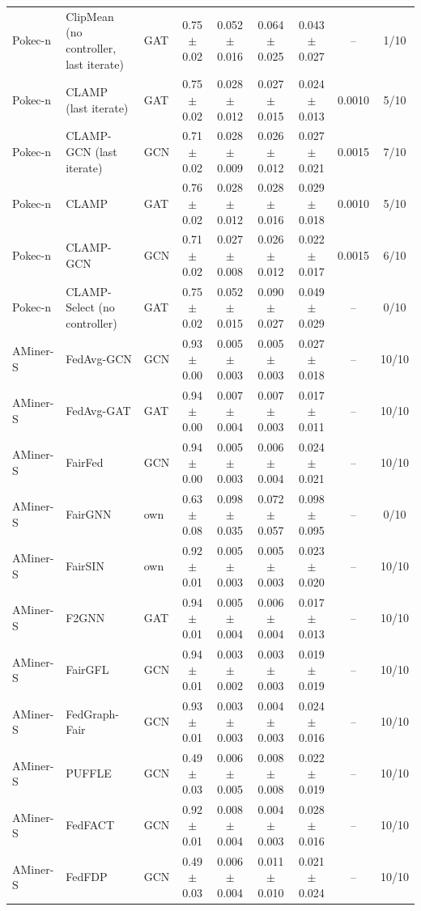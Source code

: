 \begin{longtable}{lp{3.2cm}lcccccc}
Pokec-n & ClipMean (no controller, last iterate) & GAT & 0.75$\pm$0.02 & 0.052$\pm$0.016 & 0.064$\pm$0.025 & 0.043$\pm$0.027 & -- & 1/10 \\
Pokec-n & CLAMP (last iterate) & GAT & 0.75$\pm$0.02 & 0.028$\pm$0.012 & 0.027$\pm$0.015 & 0.024$\pm$0.013 & 0.0010 & 5/10 \\
Pokec-n & CLAMP-GCN (last iterate) & GCN & 0.71$\pm$0.02 & 0.028$\pm$0.009 & 0.026$\pm$0.012 & 0.027$\pm$0.021 & 0.0015 & 7/10 \\
Pokec-n & CLAMP & GAT & 0.76$\pm$0.02 & 0.028$\pm$0.012 & 0.028$\pm$0.016 & 0.029$\pm$0.018 & 0.0010 & 5/10 \\
Pokec-n & CLAMP-GCN & GCN & 0.71$\pm$0.02 & 0.027$\pm$0.008 & 0.026$\pm$0.012 & 0.022$\pm$0.017 & 0.0015 & 6/10 \\
Pokec-n & CLAMP-Select (no controller) & GAT & 0.75$\pm$0.02 & 0.052$\pm$0.015 & 0.090$\pm$0.027 & 0.049$\pm$0.029 & -- & 0/10 \\
AMiner-S & FedAvg-GCN & GCN & 0.93$\pm$0.00 & 0.005$\pm$0.003 & 0.005$\pm$0.003 & 0.027$\pm$0.018 & -- & 10/10 \\
AMiner-S & FedAvg-GAT & GAT & 0.94$\pm$0.00 & 0.007$\pm$0.004 & 0.007$\pm$0.003 & 0.017$\pm$0.011 & -- & 10/10 \\
AMiner-S & FairFed & GCN & 0.94$\pm$0.00 & 0.005$\pm$0.003 & 0.006$\pm$0.004 & 0.024$\pm$0.021 & -- & 10/10 \\
AMiner-S & FairGNN & own & 0.63$\pm$0.08 & 0.098$\pm$0.035 & 0.072$\pm$0.057 & 0.098$\pm$0.095 & -- & 0/10 \\
AMiner-S & FairSIN & own & 0.92$\pm$0.01 & 0.005$\pm$0.003 & 0.005$\pm$0.003 & 0.023$\pm$0.020 & -- & 10/10 \\
AMiner-S & F2GNN & GAT & 0.94$\pm$0.01 & 0.005$\pm$0.004 & 0.006$\pm$0.004 & 0.017$\pm$0.013 & -- & 10/10 \\
AMiner-S & FairGFL & GCN & 0.94$\pm$0.01 & 0.003$\pm$0.002 & 0.003$\pm$0.003 & 0.019$\pm$0.019 & -- & 10/10 \\
AMiner-S & FedGraph-Fair & GCN & 0.93$\pm$0.01 & 0.003$\pm$0.003 & 0.004$\pm$0.003 & 0.024$\pm$0.016 & -- & 10/10 \\
AMiner-S & PUFFLE & GCN & 0.49$\pm$0.03 & 0.006$\pm$0.005 & 0.008$\pm$0.008 & 0.022$\pm$0.019 & -- & 10/10 \\
AMiner-S & FedFACT & GCN & 0.92$\pm$0.01 & 0.008$\pm$0.004 & 0.004$\pm$0.003 & 0.028$\pm$0.016 & -- & 10/10 \\
AMiner-S & FedFDP & GCN & 0.49$\pm$0.03 & 0.006$\pm$0.004 & 0.011$\pm$0.010 & 0.021$\pm$0.024 & -- & 10/10 \\

\end{longtable}
